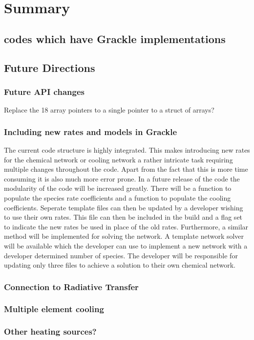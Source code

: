 \section{Summary} \label{sec:summary}



\subsection{codes which have Grackle implementations}


\subsection{Future Directions} \label{Future_Directions}

\subsubsection{Future API changes} 
Replace the 18 array pointers to a single pointer to a struct of arrays?

\subsubsection{Including new rates and models in Grackle}
\jr{} The current code structure is highly integrated. This makes introducing new rates for the 
chemical network or cooling network a rather intricate task requiring multiple changes throughout the code. 
Apart from the fact that this is more time consuming it is also much more error prone. In a future release of the 
code the modularity of the code will be increased greatly. There will be a function to populate the species 
rate coefficients and a function to populate the cooling coefficients. Seperate template files can then be 
updated by a developer wishing to use their own rates. This file can then be included in the build and a flag
set to indicate the new rates be used in place of the old rates. Furthermore, a similar method will be 
implemented for solving the network. A template network solver will be available which the developer can use to 
implement a new network with a developer determined number of species. The developer will be responsible for
updating only three files to achieve a solution to their own chemical network. 

\subsubsection{Connection to Radiative Transfer}

\subsubsection{Multiple element cooling}

\subsubsection{Other heating sources?}
